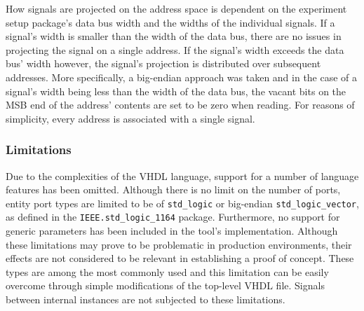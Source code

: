 \documentclass[main.tex]{subfiles}
\begin{document}
How signals are projected on the address space is dependent on the experiment setup package's data bus width and the widths of the individual signals. If a signal's width is smaller than the width of the data bus, there are no issues in projecting the signal on a single address. If the signal's width exceeds the data bus' width however, the signal's projection is distributed over subsequent addresses. More specifically, a big-endian approach was taken and in the case of a signal's width being less than the width of the data bus, the vacant bits on the MSB end of the address' contents are set to be zero when reading. For reasons of simplicity, every address is associated with a single signal. 




\subsubsection{Limitations}
Due to the complexities of the VHDL language, support for a number of language features has been omitted. Although there is no limit on the number of ports, entity port types are limited to be of \texttt{std\_logic} or big-endian \texttt{std\_logic\_vector}, as defined in the \texttt{IEEE.std\_logic\_1164} package. Furthermore, no support for generic parameters has been included in the tool's implementation. Although these limitations may prove to be problematic in production environments, their effects are not considered to be relevant in establishing a proof of concept. These types are among the most commonly used and this limitation can be easily overcome through simple modifications of the top-level VHDL file. Signals between internal instances are not subjected to these limitations.
\end{document}
